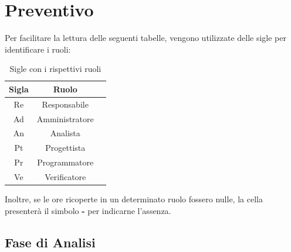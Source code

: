 \section{Preventivo}
Per facilitare la lettura delle seguenti tabelle, vengono utilizzate delle sigle 
per identificare i ruoli:

\begin{table}[H]
		\begin{center}
			\setlength{\aboverulesep}{0pt}
			\setlength{\belowrulesep}{0pt}
			\setlength{\extrarowheight}{.75ex}
			\begin{tabular}{ c c c }
				\rowcolor{AzzurroGruppo!30} 
				\textbf{Sigla} & \textbf{Ruolo} \\
				\toprule
				Re & Responsabile \\
				Ad & Amministratore\\
				An & Analista\\
				Pt & Progettista\\
				Pr & Programmatore\\
				Ve & Verificatore\\
				\bottomrule
			\end{tabular}
			\caption{Sigle con i rispettivi ruoli}
		\end{center}
	\end{table}
\noindent
Inoltre, se le ore ricoperte in un determinato ruolo fossero nulle, la cella 
presenterà il simbolo \textbf{-} per indicarne l'assenza. 

\subsection{Fase di Analisi}
